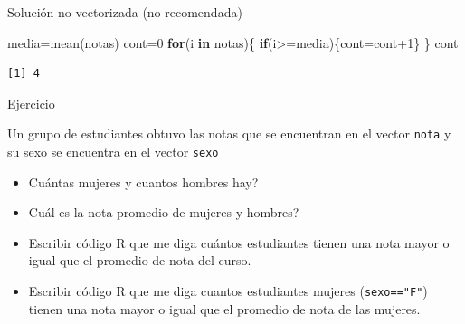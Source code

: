 \documentclass[
  ignorenonframetext,
  aspectratio=169,
  spanish,
]{beamer}
\newenvironment{Shaded}{\begin{snugshade}}{\end{snugshade}}
\newcommand{\ControlFlowTok}[1]{\textcolor[rgb]{0.00,0.23,0.31}{\textbf{#1}}}
\newcommand{\DecValTok}[1]{\textcolor[rgb]{0.68,0.00,0.00}{#1}}
\newcommand{\FunctionTok}[1]{\textcolor[rgb]{0.28,0.35,0.67}{#1}}
\newcommand{\NormalTok}[1]{\textcolor[rgb]{0.00,0.23,0.31}{#1}}
\newcommand{\OtherTok}[1]{\textcolor[rgb]{0.00,0.23,0.31}{#1}}
\newcommand{\SpecialCharTok}[1]{\textcolor[rgb]{0.37,0.37,0.37}{#1}}
\providecommand{\tightlist}{%
  \setlength{\itemsep}{0pt}\setlength{\parskip}{0pt}}
\begin{document}
\begin{frame}[fragile]{Solución no vectorizada (no recomendada)}
\label{soluciuxf3n-no-vectorizada-no-recomendada}
\begin{Shaded}
\begin{Highlighting}[]
\NormalTok{media}\OtherTok{=}\FunctionTok{mean}\NormalTok{(notas)}
\NormalTok{cont}\OtherTok{=}\DecValTok{0}
\ControlFlowTok{for}\NormalTok{(i }\ControlFlowTok{in}\NormalTok{ notas)\{}
\ControlFlowTok{if}\NormalTok{(i}\SpecialCharTok{\textgreater{}=}\NormalTok{media)\{cont}\OtherTok{=}\NormalTok{cont}\SpecialCharTok{+}\DecValTok{1}\NormalTok{\} }
\NormalTok{\}}
\NormalTok{cont}
\end{Highlighting}
\end{Shaded}

\begin{verbatim}
[1] 4
\end{verbatim}
\end{frame}

\begin{frame}[fragile]{Ejercicio}
\label{ejercicio-1}
\begin{tcolorbox}[enhanced jigsaw, leftrule=.75mm, opacitybacktitle=0.6, opacityback=0, coltitle=black, breakable, colbacktitle=quarto-callout-important-color!10!white, colback=white, titlerule=0mm, bottomrule=.15mm, left=2mm, bottomtitle=1mm, colframe=quarto-callout-important-color-frame, toptitle=1mm, toprule=.15mm, title=\textcolor{quarto-callout-important-color}{\faExclamation}\hspace{0.5em}{Importante}, arc=.35mm, rightrule=.15mm]

Un grupo de estudiantes obtuvo las notas que se encuentran en el vector
\texttt{nota} y su sexo se encuentra en el vector \texttt{sexo}

\begin{itemize}
\tightlist
\item
  Cuántas mujeres y cuantos hombres hay?
\item
  Cuál es la nota promedio de mujeres y hombres?
\item
  Escribir código R que me diga cuántos estudiantes tienen una nota
  mayor o igual que el promedio de nota del curso.
\item
  Escribir código R que me diga cuantos estudiantes mujeres
  (\texttt{sexo=="F"}) tienen una nota mayor o igual que el promedio de
  nota de las mujeres.\\
\end{itemize}

\end{tcolorbox}
\end{frame}
\end{document}
